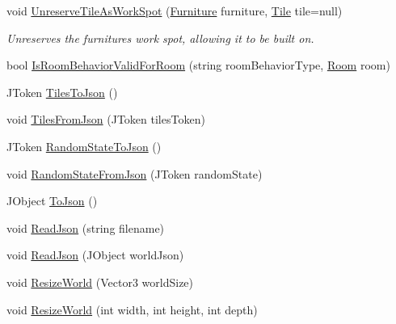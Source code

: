 \begin{DoxyCompactItemize}
void \hyperlink{class_world_a4ce845e2814d6da8d9d343ed355b02ac}{Unreserve\+Tile\+As\+Work\+Spot} (\hyperlink{class_furniture}{Furniture} furniture, \hyperlink{class_tile}{Tile} tile=null)
\begin{DoxyCompactList}\small\item\em Unreserves the furniture\textquotesingle{}s work spot, allowing it to be built on. \end{DoxyCompactList}\item 
bool \hyperlink{class_world_a4f86db4b941749f4296f1f7174405a16}{Is\+Room\+Behavior\+Valid\+For\+Room} (string room\+Behavior\+Type, \hyperlink{class_project_porcupine_1_1_rooms_1_1_room}{Room} room)
\item 
J\+Token \hyperlink{class_world_a8b99f515191218dc39f810ef8e8cd78e}{Tiles\+To\+Json} ()
\item 
void \hyperlink{class_world_a70061bfa5cbd21c61d43a92437fce140}{Tiles\+From\+Json} (J\+Token tiles\+Token)
\item 
J\+Token \hyperlink{class_world_a24c5ca21d6e92d0bd592b253adb44d7f}{Random\+State\+To\+Json} ()
\item 
void \hyperlink{class_world_a7c9fd81a0965117266dd01f4e872339d}{Random\+State\+From\+Json} (J\+Token random\+State)
\item 
J\+Object \hyperlink{class_world_aaccd8af7ffb248bdd1e741eb89afb60f}{To\+Json} ()
\item 
void \hyperlink{class_world_a0a6b09300f49b33015e9599ffb66ce25}{Read\+Json} (string filename)
\item 
void \hyperlink{class_world_a5db684d7dbe14748304c6013c16356d6}{Read\+Json} (J\+Object world\+Json)
\item 
void \hyperlink{class_world_a8ec02da60d08dcecd73e55245305aae4}{Resize\+World} (Vector3 world\+Size)
\item 
void \hyperlink{class_world_a80b2ca274375a6cc12d2deabb636bde3}{Resize\+World} (int width, int height, int depth)
\end{DoxyCompactItemize}
